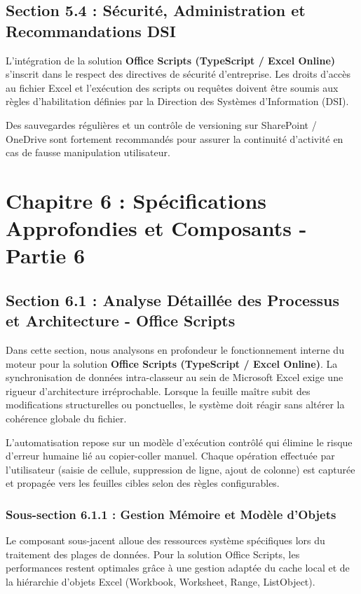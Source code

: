 \documentclass[12pt,a4paper]{report}
\begin{document}
\section{Section 5.4 : Sécurité, Administration et Recommandations DSI}
L'intégration de la solution \textbf{Office Scripts (TypeScript / Excel Online)} s'inscrit dans le respect des directives de sécurité d'entreprise. Les droits d'accès au fichier Excel et l'exécution des scripts ou requêtes doivent être soumis aux règles d'habilitation définies par la Direction des Systèmes d'Information (DSI).

Des sauvegardes régulières et un contrôle de versioning sur SharePoint / OneDrive sont fortement recommandés pour assurer la continuité d'activité en cas de fausse manipulation utilisateur.


\chapter{Chapitre 6 : Spécifications Approfondies et Composants - Partie 6}

\section{Section 6.1 : Analyse Détaillée des Processus et Architecture - Office Scripts}
Dans cette section, nous analysons en profondeur le fonctionnement interne du moteur pour la solution \textbf{Office Scripts (TypeScript / Excel Online)}. La synchronisation de données intra-classeur au sein de Microsoft Excel exige une rigueur d'architecture irréprochable. Lorsque la feuille maître subit des modifications structurelles ou ponctuelles, le système doit réagir sans altérer la cohérence globale du fichier.

L'automatisation repose sur un modèle d'exécution contrôlé qui élimine le risque d'erreur humaine lié au copier-coller manuel. Chaque opération effectuée par l'utilisateur (saisie de cellule, suppression de ligne, ajout de colonne) est capturée et propagée vers les feuilles cibles selon des règles configurables.


\subsection{Sous-section 6.1.1 : Gestion Mémoire et Modèle d'Objets}
Le composant sous-jacent alloue des ressources système spécifiques lors du traitement des plages de données. Pour la solution Office Scripts, les performances restent optimales grâce à une gestion adaptée du cache local et de la hiérarchie d'objets Excel (Workbook, Worksheet, Range, ListObject).
\end{document}

